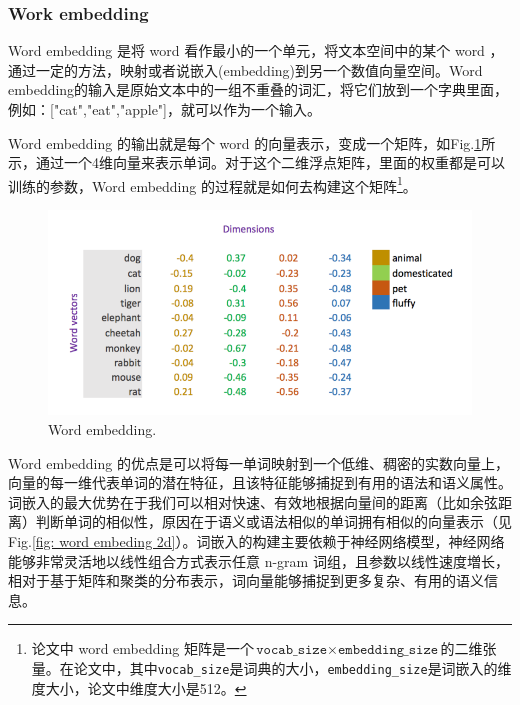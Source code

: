 \documentclass[letterpaper,10pt]{article}
\begin{document}
	\subsubsection{Work embedding}
	
	Word embedding 是将 word 看作最小的一个单元，将文本空间中的某个 word ，通过一定的方法，映射或者说嵌入(embedding)到另一个数值向量空间。Word embedding的输入是原始文本中的一组不重叠的词汇，将它们放到一个字典里面，例如：["cat","eat","apple"]，就可以作为一个输入。
	
	Word embedding 的输出就是每个 word 的向量表示，变成一个矩阵，如Fig.\ref{fig: word embedding}所示，通过一个4维向量来表示单词。对于这个二维浮点矩阵，里面的权重都是可以训练的参数，Word embedding 的过程就是如何去构建这个矩阵\footnote{论文中 word embedding 矩阵是一个$\texttt{vocab\_size} \times \texttt{embedding\_size}$的二维张量。在论文中，其中\texttt{vocab\_size}是词典的大小，\texttt{embedding\_size}是词嵌入的维度大小，论文中维度大小是512。}。
	
	\begin{figure}[htbp]
		\centering 
		\includegraphics[width=1.0\columnwidth]{picture/word_embedding}
		\captionsetup{font=scriptsize}
		\caption{
			\label{fig: word embedding}Word embedding.
		}
	\end{figure}
	
	Word embedding 的优点是可以将每一单词映射到一个低维、稠密的实数向量上，向量的每一维代表单词的潜在特征，且该特征能够捕捉到有用的语法和语义属性。词嵌入的最大优势在于我们可以相对快速、有效地根据向量间的距离（比如余弦距离）判断单词的相似性，原因在于语义或语法相似的单词拥有相似的向量表示（见Fig.\ref{fig: word embeding 2d}）。词嵌入的构建主要依赖于神经网络模型，神经网络能够非常灵活地以线性组合方式表示任意 n-gram 词组，且参数以线性速度増长，相对于基于矩阵和聚类的分布表示，词向量能够捕捉到更多复杂、有用的语义信息。
	
\end{document}
